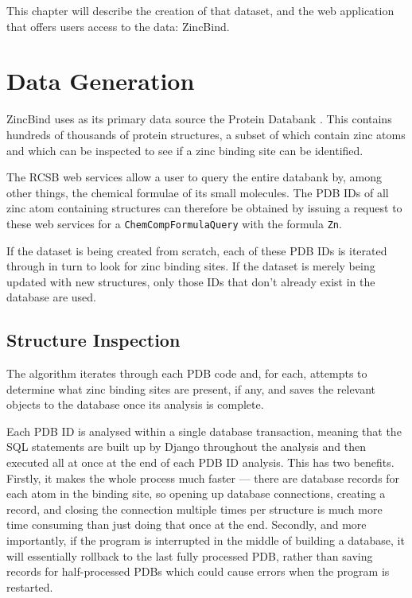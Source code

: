 This chapter will describe the creation of that dataset, and the web application that offers users access to the data: ZincBind.

\section{Data Generation}

ZincBind uses as its primary data source the Protein Databank \cite{berman2000pdb}. This contains hundreds of thousands of protein structures, a subset of which contain zinc atoms and which can be inspected to see if a zinc binding site can be identified.

The RCSB web services \cite{burley2020pdb} allow a user to query the entire databank by, among other things, the chemical formulae of its small molecules. The PDB IDs of all zinc atom containing structures can therefore be obtained by issuing a request to these web services for a \verb|ChemCompFormulaQuery| with the formula \verb|Zn|.

If the dataset is being created from scratch, each of these PDB IDs is iterated through in turn to look for zinc binding sites. If the dataset is merely being updated with new structures, only those IDs that don't already exist in the database are used.

\subsection{Structure Inspection}

The algorithm iterates through each PDB code and, for each, attempts to determine what zinc binding sites are present, if any, and saves the relevant objects to the database once its analysis is complete.

Each PDB ID is analysed within a single database transaction, meaning that the SQL statements are built up by Django throughout the analysis and then executed all at once at the end of each PDB ID analysis. This has two benefits. Firstly, it makes the whole process much faster --- there are database records for each atom in the binding site, so opening up database connections, creating a record, and closing the connection multiple times per structure is much more time consuming than just doing that once at the end. Secondly, and more importantly, if the program is interrupted in the middle of building a database, it will essentially rollback to the last fully processed PDB, rather than saving records for half-processed PDBs which could cause errors when the program is restarted.

